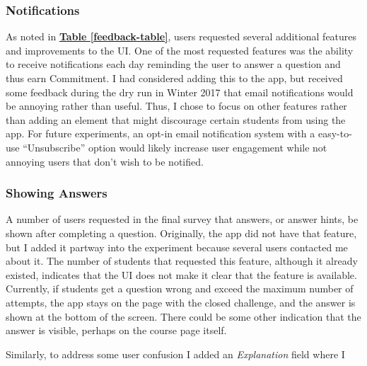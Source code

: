 \subsubsection{Notifications}

\par As noted in \textbf{\hyperref[feedback-table]{Table \ref*{feedback-table}}}, users requested several additional features and improvements to the UI. One of the most requested features was the ability to receive notifications each day reminding the user to answer a question and thus earn Commitment. I had considered adding this to the app, but received some feedback during the dry run in Winter 2017 that email notifications would be annoying rather than useful. Thus, I chose to focus on other features rather than adding an element that might discourage certain students from using the app. For future experiments, an opt-in email notification system with a easy-to-use ``Unsubscribe'' option would likely increase user engagement while not annoying users that don't wish to be notified.

\subsubsection{Showing Answers}

\par A number of users requested in the final survey that answers, or answer hints, be shown after completing a question. Originally, the app did not have that feature, but I added it partway into the experiment because several users contacted me about it. The number of students that requested this feature, although it already existed, indicates that the UI does not make it clear that the feature is available. Currently, if students get a question wrong and exceed the maximum number of attempts, the app stays on the page with the closed challenge, and the answer is shown at the bottom of the screen. There could be some other indication that the answer is visible, perhaps on the course page itself.

\par Similarly, to address some user confusion I added an \textit{Explanation} field where I 